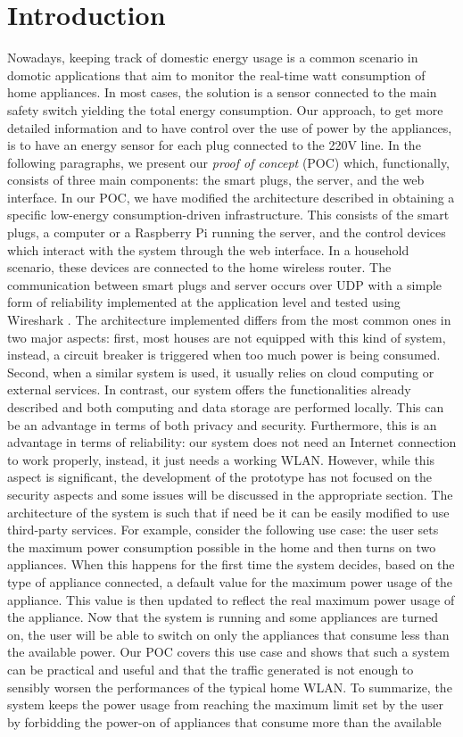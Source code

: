 \documentclass[conference]{IEEEtran}
\begin{document}
	\section{Introduction}
	Nowadays, keeping track of domestic energy usage is a common scenario in domotic applications that aim to monitor the real-time watt consumption of home appliances. In most cases, the solution is a sensor connected to the main safety switch yielding the total energy consumption. Our approach, to get more detailed information and to have control over the use of power by the appliances, is to have an energy sensor for each plug connected to the 220V line. In the following paragraphs, we present our \textit{proof of concept} (POC) which, functionally, consists of three main components: the smart plugs, the server, and the web interface. In our POC, we have modified the architecture described in \cite{8110428} obtaining a specific low-energy consumption-driven infrastructure. This consists of the smart plugs, a computer or a Raspberry Pi running the server, and the control devices which interact with the system through the web interface. In a household scenario, these devices are connected to the home wireless router. The communication between smart plugs and server occurs over UDP with a simple form of reliability implemented at the application level and tested using Wireshark \cite{wireshark}. The architecture implemented differs from the most common ones in two major aspects: first, most houses are not equipped with this kind of system, instead, a circuit breaker is triggered when too much power is being consumed. Second, when a similar system is used, it usually relies on cloud computing or external services. In contrast, our system offers the functionalities already described and both computing and data storage are performed locally. This can be an advantage in terms of both privacy and security. Furthermore, this is an advantage in terms of reliability: our system does not need an Internet connection to work properly, instead, it just needs a working WLAN. However, while this aspect is significant, the development of the prototype has not focused on the security aspects and some issues will be discussed in the appropriate section. The architecture of the system is such that if need be it can be easily modified to use third-party services. For example, consider the following use case: the user sets the maximum power consumption possible in the home and then turns on two appliances. When this happens for the first time the system decides, based on the type of appliance connected, a default value for the maximum power usage of the appliance. This value is then updated to reflect the real maximum power usage of the appliance. Now that the system is running and some appliances are turned on, the user will be able to switch on only the appliances that consume less than the available power. Our POC covers this use case and shows that such a system can be practical and useful and that the traffic generated is not enough to sensibly worsen the performances of the typical home WLAN. To summarize, the system keeps the power usage from reaching the maximum limit set by the user by forbidding the power-on of appliances that consume more than the available 
\end{document}
